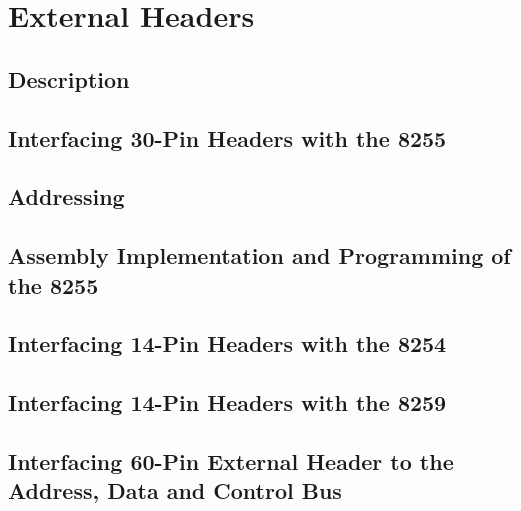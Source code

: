\section{External Headers}

    \subsection{Description}

    \subsection{Interfacing 30-Pin Headers with the 8255}

    \subsection{Addressing}

    \subsection{Assembly Implementation and Programming of the 8255}

    \subsection{Interfacing 14-Pin Headers with the 8254}

    \subsection{Interfacing 14-Pin Headers with the 8259}

    \subsection{Interfacing 60-Pin External Header to the Address, Data and Control Bus}
